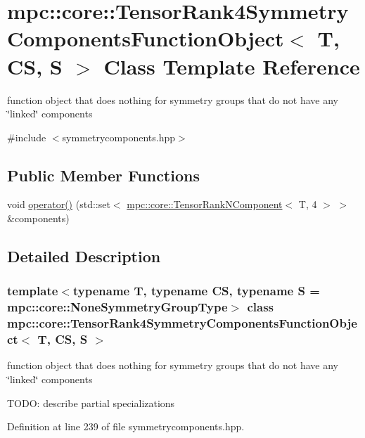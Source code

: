 \hypertarget{structmpc_1_1core_1_1_tensor_rank4_symmetry_components_function_object}{}\section{mpc\+:\+:core\+:\+:Tensor\+Rank4\+Symmetry\+Components\+Function\+Object$<$ T, CS, S $>$ Class Template Reference}
\label{structmpc_1_1core_1_1_tensor_rank4_symmetry_components_function_object}


function object that does nothing for symmetry groups that do not have any \char`\"{}linked\char`\"{} components  




{\ttfamily \#include $<$symmetrycomponents.\+hpp$>$}

\subsection*{Public Member Functions}
\begin{DoxyCompactItemize}
\item 
void \mbox{\hyperlink{structmpc_1_1core_1_1_tensor_rank4_symmetry_components_function_object_aec8a15001e34d9d89ef5b9097a0524ee}{operator()}} (std\+::set$<$ \mbox{\hyperlink{classmpc_1_1core_1_1_tensor_rank_n_component}{mpc\+::core\+::\+Tensor\+Rank\+N\+Component}}$<$ T, 4 $>$ $>$ \&components)
\end{DoxyCompactItemize}


\subsection{Detailed Description}
\subsubsection*{template$<$typename T, typename CS, typename S = mpc\+::core\+::\+None\+Symmetry\+Group\+Type$>$\newline
class mpc\+::core\+::\+Tensor\+Rank4\+Symmetry\+Components\+Function\+Object$<$ T, C\+S, S $>$}

function object that does nothing for symmetry groups that do not have any \char`\"{}linked\char`\"{} components 

T\+O\+DO\+: describe partial specializations 

Definition at line 239 of file symmetrycomponents.\+hpp.



